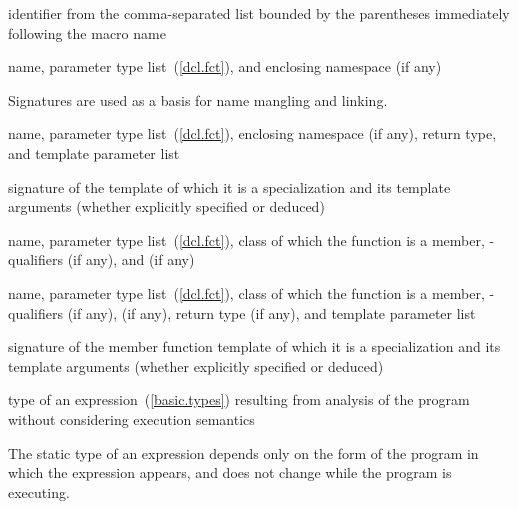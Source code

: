 %
%
 identifier from
the comma-separated list bounded by the parentheses immediately
following the macro name

%
%
 

%
 name, parameter type list~(\ref{dcl.fct}), and enclosing namespace (if any)\\
\begin{note} Signatures are used as a basis for
name mangling and linking.\end{note}

%
 name, parameter type list~(\ref{dcl.fct}), enclosing namespace (if any),
return type, and template parameter list

%
 signature of the template of which it is a specialization
and its template arguments (whether explicitly specified or deduced)

%
 name, parameter type list~(\ref{dcl.fct}), class of which the
function is a member, \cv-qualifiers (if any),
and  (if any)

%
 name, parameter type list~(\ref{dcl.fct}), class of which the
function is a member, \cv-qualifiers (if any),
 (if any), return type (if any), and template parameter list

%
 signature of the member function template
of which it is a specialization and its template arguments (whether explicitly specified or deduced)

%
type of an expression~(\ref{basic.types}) resulting from
analysis of the program without considering execution semantics\\
\begin{note} The
static type of an expression depends only on the form of the program in
which the expression appears, and does not change while the program is
executing. \end{note}

